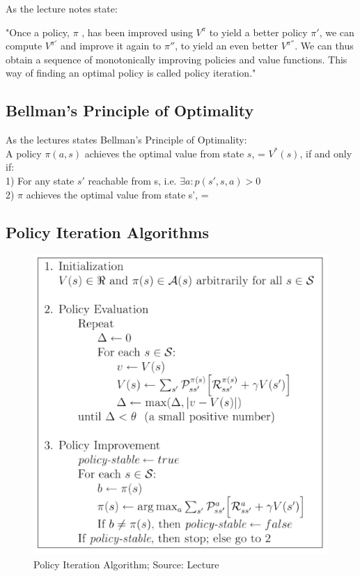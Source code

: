 As the lecture notes state:

"Once a policy, $\pi$ , has been improved using $V^{\pi}$ to yield a better policy $\pi'$, we can compute $V^{\pi'}$ and improve it again to $\pi''$, to yield an even better $V^{\pi''}$. We can thus obtain a sequence of monotonically improving policies and value functions. This way of finding an optimal policy is called policy iteration."

\subsection{Bellman's Principle of Optimality}

As the lectures states Bellman's Principle of Optimality:\\

A policy $\pi(a, s)$ achieves the optimal value from state $s$,  = $V^{*}(s)$, if and only if:\\ 
1) For any state $s'$ reachable from s, i.e. $\exists a : p(s', s, a) > 0$\\
2) $\pi$ achieves the optimal value from state s',  = 
 
\subsection{Policy Iteration Algorithms}

\begin{figure}[h!]
  \centering
  \includegraphics[scale=0.5]{figures/policy_iteration_algorithm.PNG}
  \caption{Policy Iteration Algorithm; Source: Lecture}
  \label{fig:pia}
\end{figure}

